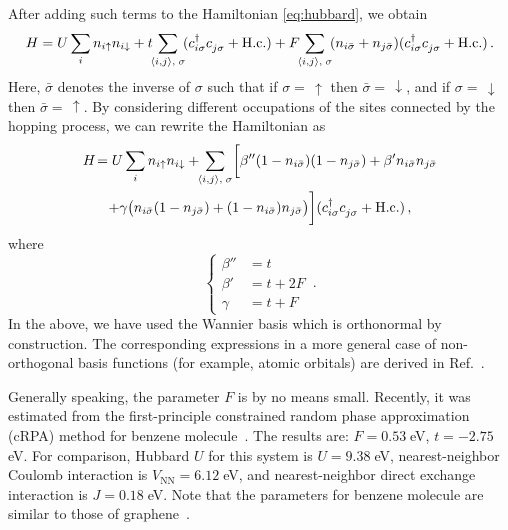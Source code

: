 After adding such terms to the Hamiltonian \eqref{eq:hubbard}, we obtain
\begin{multline*}
    H = 
        U \sum_{i} n_{i\uparrow}n_{i\downarrow}
        + t\!\!\sum_{\substack{\langle i,j\rangle, \;\sigma}}
        \!(c^\dagger_{i\sigma} c^{\vphantom{\dagger}}_{j\sigma} + \text{H.c.})
        + F\!\!\sum_{\substack{\langle i,j\rangle, \;\sigma}}
        \!(n_{i\bar{\sigma}} + n_{j\bar{\sigma}})(c^\dagger_{i\sigma} c^{\vphantom{\dagger}}_{j\sigma} + \text{H.c.})\,.
\end{multline*}
Here, $\bar\sigma$ denotes the inverse of $\sigma$ such that if $\sigma=\,\uparrow$ then $\bar\sigma=\,\downarrow$, and if $\sigma=\,\downarrow$ then $\bar\sigma=\,\uparrow$. By considering different occupations of the sites connected by the hopping process, we can rewrite the Hamiltonian as
\begin{multline}\label{eq:extended}
    H \!= 
        U \sum_{i} n_{i\uparrow}n_{i\downarrow} +
        \!\!\sum_{\substack{\langle i,j\rangle, \;\sigma}}
        \!\bigg[ \beta'' (1 - n_{i\bar\sigma}) (1 - n_{j\bar\sigma}) +
              \beta' n_{i\bar\sigma} n_{j\bar\sigma} \\
            + \gamma \big(n_{i\bar\sigma} (1 - n_{j\bar\sigma}) + (1 - n_{i\bar\sigma}) n_{j\bar\sigma}\big) \bigg]
            (c^\dagger_{i\sigma} c^{\vphantom{\dagger}}_{j\sigma} + \text{H.c.}) \,,
\end{multline}
where
\begin{equation*}
\left\{ \begin{aligned}
    \beta'' &= t \\
    \beta' &= t + 2 F \\
    \gamma &= t + F
\end{aligned} \right.\,.
\end{equation*}
In the above, we have used the Wannier basis which is orthonormal by construction. The corresponding expressions in a more general case of non-orthogonal basis functions (for example, atomic orbitals) are derived in Ref.~\cite{irkhin}.

Generally speaking, the parameter $F$ is by no means small. Recently, it was estimated from the first-principle constrained random phase approximation (cRPA) method for benzene molecule~\cite{van_loon_random_2021}. The results are: $F=0.53\;$eV, $t=-2.75\;$eV. For comparison, Hubbard $U$ for this system is $U=9.38\;$eV, nearest-neighbor Coulomb interaction is $V_\text{NN}=6.12\;$eV, and nearest-neighbor direct exchange interaction is $J=0.18\;$eV. Note that the parameters for benzene molecule are similar to those of graphene~\cite{schuler2013optimal}. 

